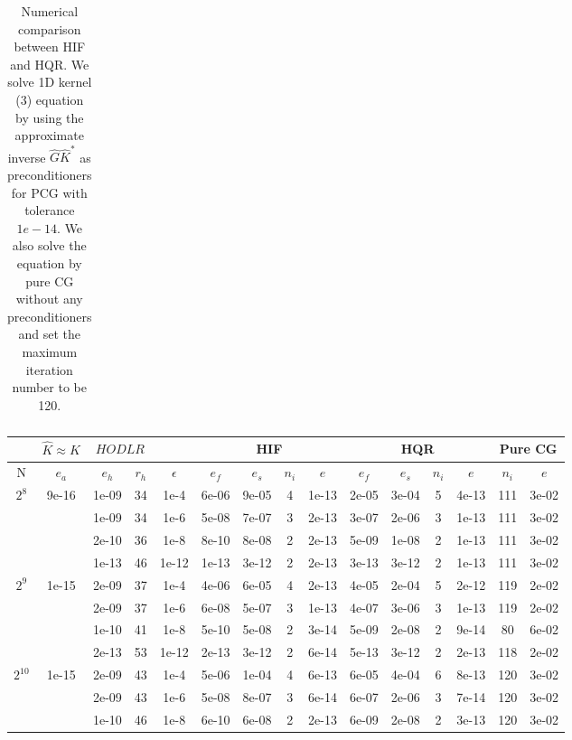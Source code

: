 \documentclass[11pt]{article}
\begin{document}
\begin{table}[!htbp]
\begin{tabular}{|c|c|c|c|c|c|c|c|c|c|c|c|c|c|c|}
\end{tabular}

\caption{Numerical comparison between HIF and HQR. We solve 1D kernel (3) equation by using the approximate inverse $\hat{G}\hat{K}^{*}$ as preconditioners for PCG with tolerance $1e-14$. We also solve the equation by pure CG without any preconditioners and set the maximum iteration number to be 120.}
\label{1d-k3}
\end{table}


\begin{table}[!htbp]
\centering
\begin{tabular}{|c|c|c|c|c|c|c|c|c|c|c|c|c|c|c|}
\hline
\multicolumn{1}{c|}{} & \multicolumn{1}{c|}{$\hat{K} \approx K$} & \multicolumn{2}{c|}{$HODLR$} & \multicolumn{1}{c|}{} &\multicolumn{4}{c|}{HIF} & \multicolumn{4}{c|}{HQR} & \multicolumn{2}{c|}{Pure CG} \\
\hline
N & $e_{a}$ & $e_{h}$ & $r_{h}$ & $\epsilon$ & $e_{f}$ & $e_{s}$ & $n_{i}$ & $e$ & $e_{f}$  & $e_{s}$ & $n_{i}$ & $e$ &  $n_{i}$ & $e$ \\ 
\hline
$2^{8}$ & 9e-16 & 1e-09 & 34 & 1e-4 & 6e-06 & 9e-05 & 4 & 1e-13 & 2e-05 & 3e-04 & 5 & 4e-13 & 111 & 3e-02\\
~ & ~ & 1e-09 & 34 & 1e-6 & 5e-08 & 7e-07 & 3 & 2e-13 & 3e-07 & 2e-06 & 3 & 1e-13 & 111 & 3e-02\\
~ & ~ & 2e-10 & 36 & 1e-8 & 8e-10 & 8e-08 & 2 & 2e-13 & 5e-09 & 1e-08 & 2 & 1e-13 & 111 & 3e-02\\
~ & ~ & 1e-13 & 46 & 1e-12 & 1e-13 & 3e-12 & 2 & 2e-13 & 3e-13 & 3e-12 & 2 & 1e-13 & 111 & 3e-02\\
\hline
$2^{9}$ & 1e-15 & 2e-09 & 37 & 1e-4 & 4e-06 & 6e-05 & 4 & 2e-13 & 4e-05 & 2e-04 & 5 & 2e-12 & 119 & 2e-02\\
~ & ~ & 2e-09 & 37 & 1e-6 & 6e-08 & 5e-07 & 3 & 1e-13 & 4e-07 & 3e-06 & 3 & 1e-13 & 119 & 2e-02\\
~ & ~ & 1e-10 & 41 & 1e-8 & 5e-10 & 5e-08 & 2 & 3e-14 & 5e-09 & 2e-08 & 2 & 9e-14 & 80 & 6e-02\\
~ & ~ & 2e-13 & 53 & 1e-12 & 2e-13 & 3e-12 & 2 & 6e-14 & 5e-13 & 3e-12 & 2 & 2e-13 & 118 & 2e-02\\
\hline
$2^{10}$ & 1e-15 & 2e-09 & 43 & 1e-4 & 5e-06 & 1e-04 & 4 & 6e-13 & 6e-05 & 4e-04 & 6 & 8e-13 & 120 & 3e-02\\
~ & ~ & 2e-09 & 43 & 1e-6 & 5e-08 & 8e-07 & 3 & 6e-14 & 6e-07 & 2e-06 & 3 & 7e-14 & 120 & 3e-02\\
~ & ~ & 1e-10 & 46 & 1e-8 & 6e-10 & 6e-08 & 2 & 2e-13 & 6e-09 & 2e-08 & 2 & 3e-13 & 120 & 3e-02\\

\end{tabular}
\end{table}
\end{document}
